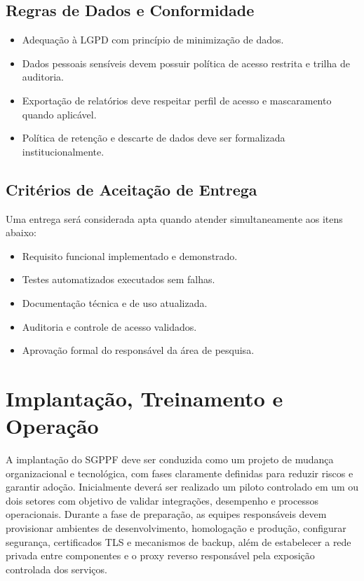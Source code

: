 \documentclass[12pt,a4paper]{article}
\begin{document}
\subsection{Regras de Dados e Conformidade}
\begin{itemize}[leftmargin=*]
  \item Adequação à LGPD com princípio de minimização de dados.
  \item Dados pessoais sensíveis devem possuir política de acesso restrita e trilha de auditoria.
  \item Exportação de relatórios deve respeitar perfil de acesso e mascaramento quando aplicável.
  \item Política de retenção e descarte de dados deve ser formalizada institucionalmente.
\end{itemize}

\subsection{Critérios de Aceitação de Entrega}
Uma entrega será considerada apta quando atender simultaneamente aos itens abaixo:
\begin{itemize}[leftmargin=*]
  \item Requisito funcional implementado e demonstrado.
  \item Testes automatizados executados sem falhas.
  \item Documentação técnica e de uso atualizada.
  \item Auditoria e controle de acesso validados.
  \item Aprovação formal do responsável da área de pesquisa.
\end{itemize}

\section{Implantação, Treinamento e Operação}
A implantação do SGPPF deve ser conduzida como um projeto de mudança organizacional e tecnológica, com fases claramente definidas para reduzir riscos e garantir adoção. Inicialmente deverá ser realizado um piloto controlado em um ou dois setores com objetivo de validar integrações, desempenho e processos operacionais. Durante a fase de preparação, as equipes responsáveis devem provisionar ambientes de desenvolvimento, homologação e produção, configurar segurança, certificados TLS e mecanismos de backup, além de estabelecer a rede privada entre componentes e o proxy reverso responsável pela exposição controlada dos serviços.
\end{document}
